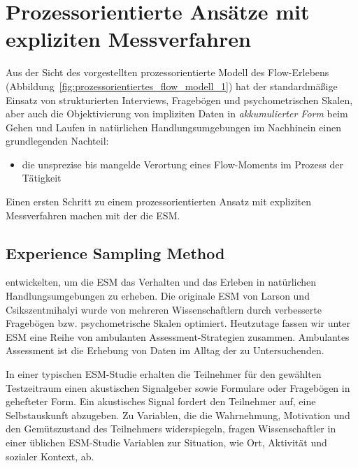 \section{Prozessorientierte Ansätze mit expliziten Messverfahren} %
\label{sec:prozessorientierte_ansatze_mit_expliziten_messverfahren}

Aus der Sicht des vorgestellten prozessorientierte Modell des Flow-Erlebens (Abbildung~\ref{fig:prozessorientiertes_flow_modell_1}) hat der standardmäßige Einsatz von strukturierten Interviews, Fragebögen und psychometrischen Skalen, aber auch die Objektivierung von impliziten Daten in \emph{akkumulierter Form} beim Gehen und Laufen in natürlichen Handlungsumgebungen im Nachhinein einen grundlegenden Nachteil:

\begin{itemize}
	\item die unsprezise bis mangelde Verortung eines Flow-Moments im Prozess der Tätigkeit 
\end{itemize}

Einen ersten Schritt zu einem prozessorientierten Ansatz mit expliziten Messverfahren machen \citep{Larson1983} mit der die \ac{ESM}.

\subsection{Experience Sampling Method} %
\label{sub:experience_sampling_method}

\citet{Larson1983} entwickelten, um die \ac{ESM} das Verhalten und das Erleben in natürlichen Handlungsumgebungen zu erheben. Die originale \ac{ESM} von Larson und Csikszentmihalyi wurde von mehreren Wissenschaftlern \citep[z.~B.][]{Schallberger2001, Rheinberg2003} durch verbesserte Fragebögen bzw. psychometrische Skalen optimiert. Heutzutage fassen wir unter \ac{ESM} eine Reihe von ambulanten Assessment-Strategien zusammen. Ambulantes Assessment ist die Erhebung von Daten im Alltag der zu Untersuchenden.

In einer typischen \ac{ESM}-Studie erhalten die Teilnehmer für den gewählten Testzeitraum einen akustischen Signalgeber sowie Formulare oder Fragebögen in gehefteter Form. Ein akustisches Signal fordert den Teilnehmer auf, eine Selbstauskunft abzugeben. Zu Variablen, die die Wahrnehmung, Motivation und den Gemütszustand des Teilnehmers widerspiegeln, fragen Wissenschaftler in einer üblichen \ac{ESM}-Studie Variablen zur Situation, wie Ort, Aktivität und sozialer Kontext, ab. 

